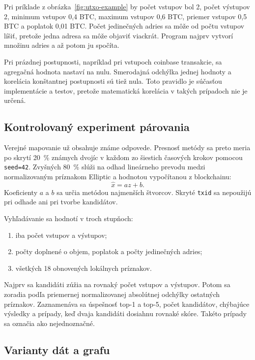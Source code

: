 Pri príklade z obrázka~\ref{fig:utxo-example} by počet vstupov bol 2,
počet výstupov 2, minimum vstupov 0,4 BTC, maximum vstupov 0,6 BTC,
priemer vstupov 0,5 BTC a poplatok 0,01 BTC. Počet jedinečných adries
sa môže od počtu vstupov líšiť, pretože jedna adresa sa môže objaviť
viackrát. Program najprv vytvorí množinu adries a až potom ju spočíta.

Pri prázdnej postupnosti, napríklad pri vstupoch coinbase transakcie,
sa agregačná hodnota nastaví na nulu. Smerodajná odchýlka jednej
hodnoty a korelácia konštantnej postupnosti sú tiež nula. Toto pravidlo
je súčasťou implementácie a testov, pretože matematická korelácia v
takých prípadoch nie je určená.

\subsection{Kontrolovaný experiment párovania}

Verejné mapovanie už obsahuje známe odpovede. Presnosť metódy sa preto
meria po skrytí 20~\% známych dvojíc v každom zo šiestich časových
krokov pomocou \texttt{seed=42}. Zvyšných 80~\% slúži na
odhad lineárneho prevodu medzi normalizovaným príznakom Elliptic a
hodnotou vypočítanou z blockchainu:
\begin{equation}
  \hat{x}=a z+b.
\end{equation}
Koeficienty $a$ a $b$ sa určia metódou najmenších štvorcov. Skryté
\texttt{txid} sa nepoužijú pri odhade ani pri tvorbe kandidátov.

Vyhľadávanie sa hodnotí v troch stupňoch:
\begin{enumerate}
  \item iba počet vstupov a výstupov;
  \item počty doplnené o objem, poplatok a počty jedinečných adries;
  \item všetkých 18 obnovených lokálnych príznakov.
\end{enumerate}
Najprv sa kandidáti zúžia na rovnaký počet vstupov a výstupov. Potom
sa zoradia podľa priemernej normalizovanej absolútnej odchýlky ostatných
príznakov. Zaznamenáva sa úspešnosť top-1 a top-5, počet kandidátov,
chýbajúce výsledky a prípady, keď dvaja kandidáti dosiahnu rovnaké
skóre. Takéto prípady sa označia ako nejednoznačné.

\subsection{Varianty dát a grafu}

